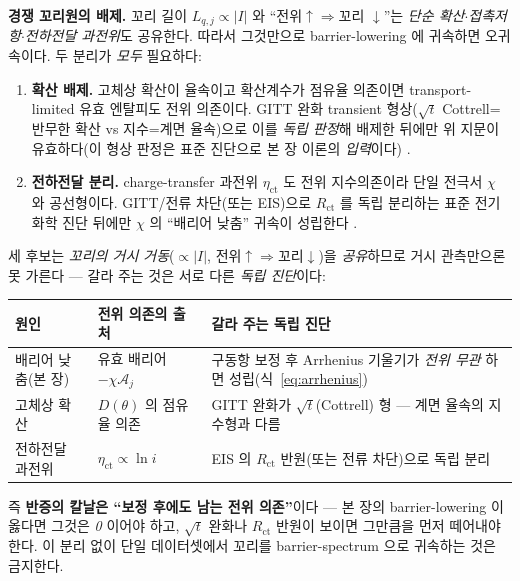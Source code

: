 \documentclass[11pt,a4paper]{article}
\begin{document}
\textbf{경쟁 꼬리원의 배제.} 꼬리 길이 $L_{q,j}\propto|I|$ 와 ``전위$\uparrow\Rightarrow$꼬리
$\downarrow$''는 \emph{단순 확산$\cdot$접촉저항$\cdot$전하전달 과전위}도 공유한다. 따라서 그것만으로
barrier-lowering 에 귀속하면 오귀속이다. 두 분리가 \emph{모두} 필요하다:
\begin{enumerate}[label=(\roman*),leftmargin=2.0em,itemsep=2pt]
\item \textbf{확산 배제.} 고체상 확산이 율속이고 확산계수가 점유율 의존이면 transport-limited 유효 엔탈피도 전위
  의존이다. GITT 완화 transient 형상($\sqrt t$ Cottrell=반무한 확산 vs 지수=계면 율속)으로 이를 \emph{독립 판정}해
  배제한 뒤에만 위 지문이 유효하다(이 형상 판정은 표준 진단으로 본 장 이론의 \emph{입력}이다) \cite{weppner1977}.
\item \textbf{전하전달 분리.} charge-transfer 과전위 $\eta_\mathrm{ct}$ 도 전위 지수의존이라 단일 전극서 $\chi$ 와
  공선형이다. GITT/전류 차단(또는 EIS)으로 $R_\mathrm{ct}$ 를 독립 분리하는 표준 전기화학 진단 뒤에만 $\chi$ 의
  ``배리어 낮춤'' 귀속이 성립한다 \cite{weppner1977,dubarry2012}.
\end{enumerate}
세 후보는 \emph{꼬리의 거시 거동}($\propto|I|$, 전위$\uparrow\Rightarrow$꼬리$\downarrow$)을 \emph{공유}하므로
거시 관측만으론 못 가른다 — 갈라 주는 것은 서로 다른 \emph{독립 진단}이다:
\begin{center}
\renewcommand{\arraystretch}{1.35}
\begin{tabular}{p{} p{} p{}}
\toprule
원인 & 전위 의존의 출처 & 갈라 주는 독립 진단 \\
\midrule
배리어 낮춤(본 장) & 유효 배리어 $-\chi\mathcal A_j$ & 구동항 보정 후 Arrhenius 기울기가 \emph{전위 무관} 하면 성립(식~\eqref{eq:arrhenius}) \\
고체상 확산 & $D(\theta)$ 의 점유율 의존 & GITT 완화가 $\sqrt t$(Cottrell) 형 — 계면 율속의 지수형과 다름 \\
전하전달 과전위 & $\eta_\mathrm{ct}\propto\ln i$ & EIS 의 $R_\mathrm{ct}$ 반원(또는 전류 차단)으로 독립 분리 \\
\bottomrule
\end{tabular}
\end{center}
즉 \textbf{반증의 칼날은 ``보정 후에도 남는 전위 의존''}이다 — 본 장의 barrier-lowering 이 옳다면 그것은 \emph{0}
이어야 하고, $\sqrt t$ 완화나 $R_\mathrm{ct}$ 반원이 보이면 그만큼을 먼저 떼어내야 한다. 이 분리 없이 단일
데이터셋에서 꼬리를 barrier-spectrum 으로 귀속하는 것은 금지한다.
\end{document}
